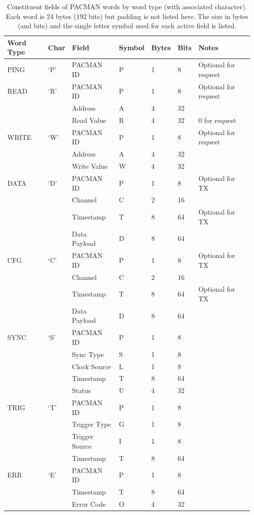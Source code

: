 \documentclass[12pt]{article}
\begin{document}
\begin{table}[htbp]
\centering
\begin{tabular}{|ll|lllll|}
\hline
Word Type & Char & Field & Symbol & Bytes & Bits & Notes \\
\hline
PING  & `P' & PACMAN ID      & P & 1 & 8  & Optional for request\\
\hline
READ  & `R' & PACMAN ID      & P & 1 & 8  & Optional for request\\
~     &     & Address        & A & 4 & 32 & \\
~     &     & Read Value     & R & 4 & 32 & 0 for request\\
\hline
WRITE & `W' & PACMAN ID      & P & 1 & 8  & Optional for request\\
~     &     & Address        & A & 4 & 32 & \\
~     &     & Write Value    & W & 4 & 32 & \\
\hline
DATA  & `D' & PACMAN ID      & P & 1 & 8  & Optional for TX \\
~     &     & Channel        & C & 2 & 16 & \\
~     &     & Timestamp      & T & 8 & 64 & Optional for TX \\
~     &     & Data Payload   & D & 8 & 64 & \\
\hline
CFG   & `C' & PACMAN ID      & P & 1 & 8  & Optional for TX \\
~     &     & Channel        & C & 2 & 16 & \\
~     &     & Timestamp      & T & 8 & 64 & Optional for TX \\
~     &     & Data Payload   & D & 8 & 64 & \\
\hline
SYNC  & `S' & PACMAN ID      & P & 1 & 8  & \\
~     &     & Sync Type      & S & 1 & 8  & \\
~     &     & Clock Source   & L & 1 & 8  & \\
~     &     & Timestamp      & T & 8 & 64 & \\
~     &     & Status         & U & 4 & 32 & \\
\hline
TRIG  & `T' & PACMAN ID      & P & 1 & 8  & \\
~     &     & Trigger Type   & G & 1 & 8  & \\
~     &     & Trigger Source & I & 1 & 8  & \\
~     &     & Timestamp      & T & 8 & 64 & \\
\hline
ERR   & `E' & PACMAN ID      & P & 1 & 8  & \\
~     &     & Timestamp      & T & 8 & 64 & \\
~     &     & Error Code     & O & 4 & 32 & \\
\hline
\end{tabular}
\caption{Constituent fields of PACMAN words by word type (with
  associated character).  Each word is 24 bytes (192 bits) but padding
  is not listed here.  The size in bytes (and bits) and the single
  letter symbol used for each active field is listed.}
\label{tbl:pacman_word_fields}
\end{table}
\end{document}

